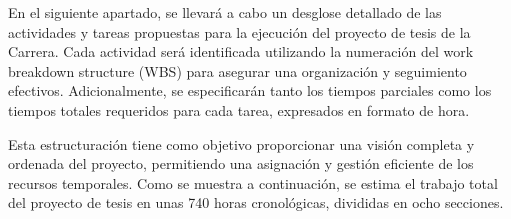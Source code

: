 %
%
%
%


\label{sec:wbs}

En el siguiente apartado, se llevará a cabo un desglose detallado de las actividades y tareas propuestas para la ejecución del proyecto de tesis de la Carrera. Cada actividad será identificada utilizando la numeración del work breakdown structure (WBS) para asegurar una organización y seguimiento efectivos. Adicionalmente, se especificarán tanto los tiempos parciales como los tiempos totales requeridos para cada tarea, expresados en formato de hora.

Esta estructuración tiene como objetivo proporcionar una visión completa y ordenada del proyecto, permitiendo una asignación y gestión eficiente de los recursos temporales. Como se muestra a continuación, se estima el trabajo total del proyecto de tesis en unas 740 horas cronológicas, divididas en ocho secciones.



